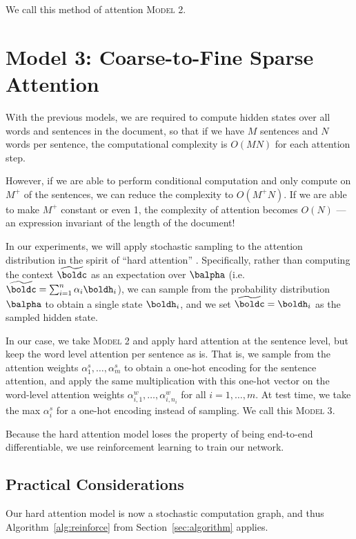 \documentclass[12pt]{report}
\begin{document}
We call this method of attention \textsc{Model 2}.

\section{Model 3: Coarse-to-Fine Sparse Attention}

With the previous models, we are required to compute hidden states over all words and sentences in the document, so that if we have $M$ sentences and $N$ words per sentence, the computational complexity is $O(MN)$ for each attention step.

However, if we are able to perform conditional computation and only compute on $M^+$ of the sentences, we can reduce the complexity to $O(M^+N)$. If we are able to make $M^+$ constant or even 1, the complexity of attention becomes $O(N)$ --- an expression invariant of the length of the document!

In our experiments, we will apply stochastic sampling to the attention distribution in the spirit of ``hard attention'' \citep{xu2015captioning}.
Specifically, rather than computing the context $\widetilde{\boldc}$ as an expectation over $\balpha$ (i.e. $\widetilde{\boldc} = \sum_{i=1}^n \alpha_i \boldh_i$), we can sample from the probability distribution $\balpha$ to obtain a single state $\boldh_i$, and we set $\widetilde{\boldc} = \boldh_i$ as the sampled hidden state.

In our case, we take \textsc{Model 2} and apply hard attention at the sentence level, but keep the word level attention per sentence as is. That is, we sample from the attention weights $\alpha_1^s, \ldots, \alpha_m^s$ to obtain a one-hot encoding for the sentence attention, and apply the same multiplication with this one-hot vector on the word-level attention weights $\alpha_{i,1}^w, \ldots, \alpha_{i,n_i}^w$ for all $i = 1, \ldots, m$. At test time, we take the max $\alpha_i^s$ for a one-hot encoding instead of sampling. We call this \textsc{Model 3}.


Because the hard attention model loses the property of being end-to-end differentiable, we use reinforcement learning to train our network.


\subsection{Practical Considerations}
\label{sec:practical}

Our hard attention model is now a stochastic computation graph, and thus Algorithm~\ref{alg:reinforce} from Section~\ref{sec:algorithm} applies.
\end{document}
